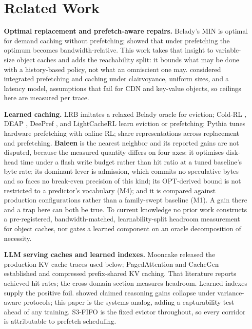 \documentclass[letterpaper]{article} %
\begin{document}
\section{Related Work}
\textbf{Optimal replacement and prefetch-aware repairs.} Belady's MIN \citep{belady} is optimal for demand caching without prefetching; \citet{demandmin} showed that under prefetching the optimum becomes bandwidth-relative. This work takes that insight to variable-size object caches and adds the reachability split: it bounds what may be done with a history-based policy, not what an omniscient one may. \citet{cao} considered integrated prefetching and caching under clairvoyance, uniform sizes, and a latency model, assumptions that fail for CDN and key-value objects, so ceilings here are measured per trace.

\textbf{Learned caching.} LRB \citep{lrb} imitates a relaxed Belady oracle for eviction; Cold-RL \citep{coldrl}, DEAP \citep{deap}, DeePref \citep{deepref}, and LightCacheRL \citep{lightcache} learn eviction or prefetching; Pythia \citep{pythia} tunes hardware prefetching with online RL; \citet{jointhw} share representations across replacement and prefetching. \textbf{Baleen} \citep{baleen} is the nearest neighbor and its reported gains are not disputed, because the measured quantity differs on four axes: it optimises disk-head time under a flash write budget rather than hit ratio at a tuned baseline's byte rate; its dominant lever is admission, which commits no speculative bytes and so faces no break-even precision of this kind; its OPT-derived bound is not restricted to a predictor's vocabulary (M4); and it is compared against production configurations rather than a family-swept baseline (M1). A gain there and a trap here can both be true. To current knowledge no prior work constructs a pre-registered, bandwidth-matched, learnability-split headroom measurement for object caches, nor gates a learned component on an oracle decomposition of necessity.

\textbf{LLM serving caches and learned indexes.} Mooncake \citep{mooncake} released the production KV-cache traces used below; PagedAttention \citep{vllm} and CacheGen \citep{cachegen} established and compressed prefix-shared KV caching. That literature reports achieved hit rates; the cross-domain section measures headroom. Learned indexes \citep{kraska,sosd} supply the positive foil. \citet{sober} showed claimed reasoning gains collapse under variance-aware protocols; this paper is the systems analog, adding a capturability test ahead of any training. S3-FIFO \citep{s3fifo} is the fixed evictor throughout, so every corridor is attributable to prefetch scheduling.
\end{document}
